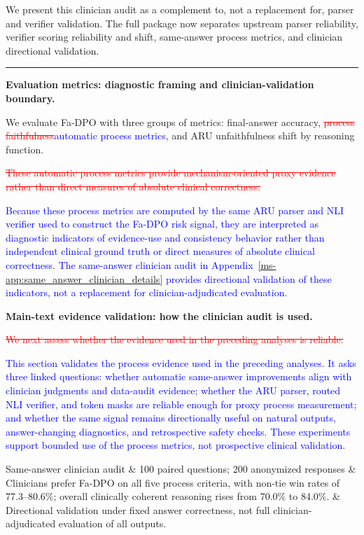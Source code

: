 \documentclass[12pt]{article}
\newcommand{\deleted}[1]{\textcolor{red}{\sout{#1}}}
\newcommand{\added}[1]{\textcolor{blue}{#1}}
\newcommand{\responseheading}[1]{%
    \vspace{0.24cm}
    \par\noindent{\large\bfseries #1}\par
    \vspace{0.03cm}
    \noindent\rule{\linewidth}{0.35pt}\par
    \vspace{0.06cm}
    \noindent\ignorespaces
}
\begin{document}
We present this clinician audit as a complement to, not a replacement for, parser and
verifier validation. The full package now separates upstream parser reliability,
verifier scoring reliability and shift, same-answer process metrics, and clinician
directional validation.


\responseheading{Revision Details}
\textbf{Evaluation metrics: diagnostic framing and clinician-validation boundary.}
\begin{displayquote}
We evaluate Fa-DPO with three groups of metrics: final-answer accuracy,
\deleted{process faithfulness}\added{automatic process metrics}, and ARU
unfaithfulness shift by reasoning function.

\deleted{These automatic process metrics provide mechanism-oriented proxy evidence rather than direct measures of absolute clinical correctness.}

\added{Because these process metrics are computed by the same ARU parser and NLI verifier used to construct the Fa-DPO risk signal, they are interpreted as diagnostic indicators of evidence-use and consistency behavior rather than independent clinical ground truth or direct measures of absolute clinical correctness. The same-answer clinician audit in Appendix~\ref*{ms-app:same_answer_clinician_details} provides directional validation of these indicators, not a replacement for clinician-adjudicated evaluation.}
\end{displayquote}

\textbf{Main-text evidence validation: how the clinician audit is used.}
\begin{displayquote}
\deleted{We next assess whether the evidence used in the preceding analyses is reliable.}

\added{This section validates the process evidence used in the preceding analyses. It asks three linked questions: whether automatic same-answer improvements align with clinician judgments and data-audit evidence; whether the ARU parser, routed NLI verifier, and token masks are reliable enough for proxy process measurement; and whether the same signal remains directionally useful on natural outputs, answer-changing diagnostics, and retrospective safety checks. These experiments support bounded use of the process metrics, not prospective clinical validation.}

{\color{blue}Same-answer clinician audit \& 100 paired questions; 200 anonymized responses \& Clinicians prefer Fa-DPO on all five process criteria, with non-tie win rates of 77.3--80.6\%; overall clinically coherent reasoning rises from 70.0\% to 84.0\%. \& Directional validation under fixed answer correctness, not full clinician-adjudicated evaluation of all outputs.}

\end{displayquote}
\end{document}
